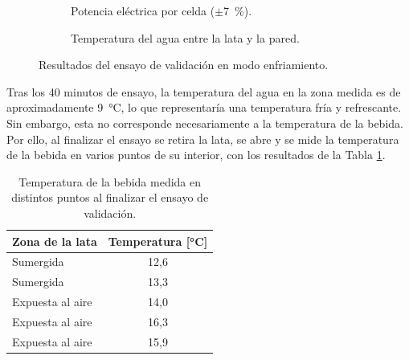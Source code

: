 \documentclass[12pt, a4paper]{article}
\begin{document}
\begin{figure}[H]
    \centering
    \begin{subfigure}[b]{0.48\textwidth}
        \centering
        \caption{Potencia eléctrica por celda ($\pm$\SI{7}{\percent}).}
    \end{subfigure}
    \hfill
    \begin{subfigure}[b]{0.48\textwidth}
        \centering
        \caption{Temperatura del agua entre la lata y la pared.}
    \end{subfigure}
    \caption{Resultados del ensayo de validación en modo enfriamiento.}
    \label{fig:resultados_ensayo_validacion}
\end{figure}

Tras los 40 minutos de ensayo, la temperatura del agua en la zona medida es de aproximadamente \SI{9}{\celsius}, lo que representaría una temperatura fría y refrescante. Sin embargo, esta no corresponde necesariamente a la temperatura de la bebida. Por ello, al finalizar el ensayo se retira la lata, se abre y se mide la temperatura de la bebida en varios puntos de su interior, con los resultados de la Tabla \ref{tab:temperatura_bebida}.

\begin{table}[H]
\centering
\small
\begin{tabular}{lc}
\toprule
\textbf{Zona de la lata} & \textbf{Temperatura [\si{\celsius}]} \\
\midrule
Sumergida & 12,6 \\
Sumergida & 13,3 \\
Expuesta al aire & 14,0 \\
Expuesta al aire & 16,3 \\
Expuesta al aire & 15,9 \\
\bottomrule
\end{tabular}
\caption{Temperatura de la bebida medida en distintos puntos al finalizar el ensayo de validación.}
\label{tab:temperatura_bebida}
\end{table}
\end{document}
